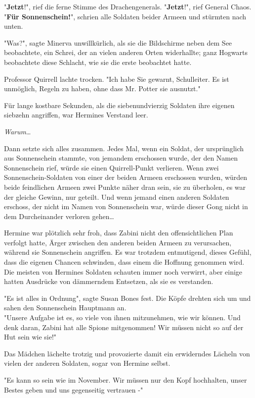 {"\textbf{Jetzt}!", rief die ferne Stimme des Drachengenerals. "\textbf{Jetzt}!", rief General Chaos.\\ "\textbf{Für Sonnenschein!}", schrien alle Soldaten beider Armeen und stürmten nach unten.

"Was?", sagte Minerva unwillkürlich, als sie die Bildschirme neben dem See beobachtete, ein Schrei, der an vielen anderen Orten widerhallte; ganz Hogwarts beobachtete diese Schlacht, wie sie die erste beobachtet hatte.

Professor Quirrell lachte trocken. "Ich habe Sie gewarnt, Schulleiter. Es ist unmöglich, Regeln zu haben, ohne dass Mr. Potter sie ausnutzt."

Für lange kostbare Sekunden, als die siebenundvierzig Soldaten ihre eigenen siebzehn angriffen, war Hermines Verstand leer.

\emph{Warum}…

Dann setzte sich alles zusammen. Jedes Mal, wenn ein Soldat, der ursprünglich aus Sonnenschein stammte, von jemandem erschossen wurde, der den Namen Sonnenschein rief, würde sie einen Quirrell-Punkt verlieren. Wenn zwei Sonnenschein-Soldaten von einer der beiden Armeen erschossen wurden, würden beide feindlichen Armeen zwei Punkte näher dran sein, sie zu überholen, es war der gleiche Gewinn, nur geteilt. Und wenn jemand einen anderen Soldaten erschoss, der nicht im Namen von Sonnenschein war, würde dieser Gong nicht in dem Durcheinander verloren gehen…

Hermine war plötzlich sehr froh, dass Zabini nicht den offensichtlichen Plan verfolgt hatte, Ärger zwischen den anderen beiden Armeen zu verursachen, während sie Sonnenschein angriffen. Es war trotzdem entmutigend, dieses Gefühl, dass die eigenen Chancen schwinden, dass einem die Hoffnung genommen wird. Die meisten von Hermines Soldaten schauten immer noch verwirrt, aber einige hatten Ausdrücke von dämmerndem Entsetzen, als sie es verstanden.

"Es ist alles in Ordnung", sagte Susan Bones fest. Die Köpfe drehten sich um und sahen den Sonnenschein Hauptmann an.\\ "Unsere Aufgabe ist es, so viele von ihnen mitzunehmen, wie wir können. Und denk daran, Zabini hat alle Spione mitgenommen! Wir müssen nicht so auf der Hut sein wie sie!"

Das Mädchen lächelte trotzig und provozierte damit ein erwiderndes Lächeln von vielen der anderen Soldaten, sogar von Hermine selbst.

"Es kann so sein wie im November. Wir müssen nur den Kopf hochhalten, unser Bestes geben und uns gegenseitig vertrauen -"

}
